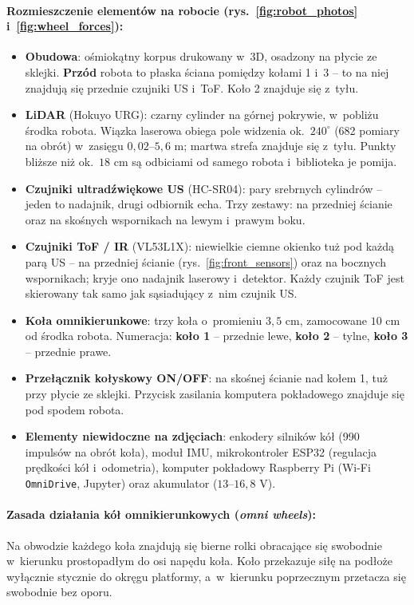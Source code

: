 \documentclass[10pt,a4paper]{article}
\begin{document}
\paragraph{Rozmieszczenie elementów na robocie (rys.~\ref{fig:robot_photos} i~\ref{fig:wheel_forces}):}
\begin{itemize}[itemsep=3pt, topsep=3pt]
    \item \textbf{Obudowa}: ośmiokątny korpus drukowany w~3D, osadzony na płycie ze sklejki. \textbf{Przód} robota to płaska ściana pomiędzy kołami 1 i~3 -- to na niej znajdują się przednie czujniki US i~ToF. Koło 2 znajduje się z~tyłu.
    \item \textbf{LiDAR} (Hokuyo URG): czarny cylinder na górnej pokrywie, w~pobliżu środka robota. Wiązka laserowa obiega pole widzenia ok.~$240^\circ$ (682 pomiary na obrót) w~zasięgu $0{,}02$--$5{,}6\text{ m}$; martwa strefa znajduje się z~tyłu. Punkty bliższe niż ok.~$18\text{ cm}$ są odbiciami od samego robota i~biblioteka je pomija.
    \item \textbf{Czujniki ultradźwiękowe US} (HC-SR04): pary srebrnych cylindrów -- jeden to nadajnik, drugi odbiornik echa. Trzy zestawy: na przedniej ścianie oraz na skośnych wspornikach na lewym i~prawym boku.
    \item \textbf{Czujniki ToF / IR} (VL53L1X): niewielkie ciemne okienko tuż pod każdą parą US -- na przedniej ścianie (rys.~\ref{fig:front_sensors}) oraz na bocznych wspornikach; kryje ono nadajnik laserowy i~detektor. Każdy czujnik ToF jest skierowany tak samo jak sąsiadujący z~nim czujnik US.
    \item \textbf{Koła omnikierunkowe}: trzy koła o~promieniu $3{,}5\text{ cm}$, zamocowane $10\text{ cm}$ od środka robota. Numeracja: \textbf{koło 1} -- przednie lewe, \textbf{koło 2} -- tylne, \textbf{koło 3} -- przednie prawe.
    \item \textbf{Przełącznik kołyskowy ON/OFF}: na skośnej ścianie nad kołem 1, tuż przy płycie ze sklejki. Przycisk zasilania komputera pokładowego znajduje się pod spodem robota.
    \item \textbf{Elementy niewidoczne na zdjęciach}: enkodery silników kół (990 impulsów na obrót koła), moduł IMU, mikrokontroler ESP32 (regulacja prędkości kół i~odometria), komputer pokładowy Raspberry Pi (Wi-Fi \texttt{OmniDrive}, Jupyter) oraz akumulator ($13$--$16{,}8\text{ V}$).
\end{itemize}

\paragraph{Zasada działania kół omnikierunkowych (\emph{omni wheels}):}
Na obwodzie każdego koła znajdują się bierne rolki obracające się swobodnie w~kierunku prostopadłym do osi napędu koła. Koło przekazuje siłę na podłoże wyłącznie stycznie do okręgu platformy, a~w~kierunku poprzecznym przetacza się swobodnie bez oporu.
\end{document}
